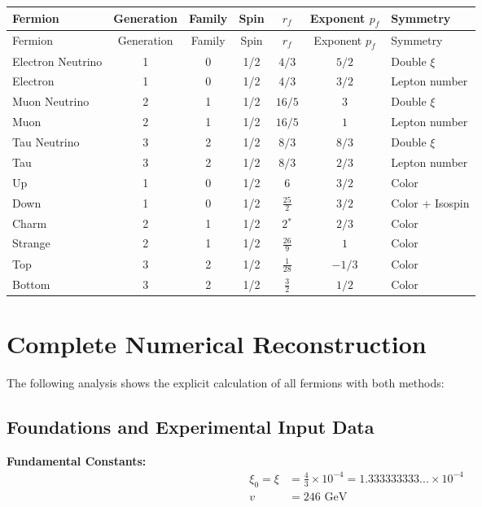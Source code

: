 \documentclass[12pt,a4paper]{article}
\begin{document}
	\begin{longtable}{|l|c|c|c|c|c|l|}
		\hline
		Fermion & Generation & Family & Spin & $r_f$ & Exponent $p_f$ & Symmetry \\
		\hline
		\endfirsthead
		\hline
		Fermion & Generation & Family & Spin & $r_f$ & Exponent $p_f$ & Symmetry \\
		\hline
		\endhead
		Electron Neutrino & 1 & 0 & 1/2 & $4/3$ & $5/2$ & Double $\xi$ \\
		Electron          & 1 & 0 & 1/2 & $4/3$  & $3/2$ & Lepton number \\
		Muon Neutrino     & 2 & 1 & 1/2 & $16/5$ & $3$ & Double $\xi$ \\
		Muon              & 2 & 1 & 1/2 & $16/5$ & $1$   & Lepton number \\
		Tau Neutrino      & 3 & 2 & 1/2 & $8/3$ & $8/3$ & Double $\xi$ \\
		Tau               & 3 & 2 & 1/2 & $8/3$  & $2/3$ & Lepton number \\
		\hline
		Up     & 1 & 0 & 1/2 & $6$          & $3/2$ & Color \\
		Down   & 1 & 0 & 1/2 & $\tfrac{25}{2}$ & $3/2$ & Color + Isospin \\
		Charm  & 2 & 1 & 1/2 & $2$$^*$          & $2/3$ & Color \\
		Strange& 2 & 1 & 1/2 & $\tfrac{26}{9}$ & $1$   & Color \\
		Top    & 3 & 2 & 1/2 & $\tfrac{1}{28}$ & $-1/3$ & Color \\
		Bottom & 3 & 2 & 1/2 & $\tfrac{3}{2}$  & $1/2$ & Color \\
		\hline
	\end{longtable}
	
	
	\section{Complete Numerical Reconstruction}
	\label{sec:complete_reconstruction}
	
	The following analysis shows the explicit calculation of all fermions with both methods:
	
	\subsection{Foundations and Experimental Input Data}
	\label{subsec:foundations}
	
	\textbf{Fundamental Constants:}
	\begin{align}
		\xi_0 = \xi &= \frac{4}{3} \times 10^{-4} = 1.333333333... \times 10^{-4} \\
		v &= 246 \text{ GeV}
	\end{align}
	
\end{document}
